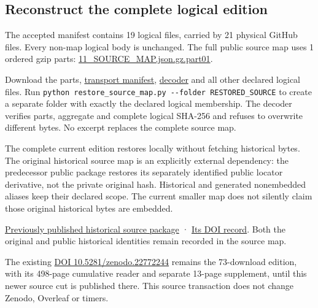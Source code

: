\documentclass[
]{article}
\newcounter{none} %
\begin{document}
\subsection{Reconstruct the complete logical
edition}\label{reconstruct-the-complete-logical-edition}

The accepted manifest contains 19 logical files, carried by 21 physical
GitHub files. Every non-map logical body is unchanged. The full public
source map uses 1 ordered gzip parts:
\href{https://github.com/KokunoYumeto/zeta-function-research-reader/blob/main/workbenches/splitzero-tandem/continuations/20260915-primitive-band-continuation/11_SOURCE_MAP.json.gz.part01}{11\_SOURCE\_MAP.json.gz.part01}.

Download the parts,
\href{https://github.com/KokunoYumeto/zeta-function-research-reader/blob/main/workbenches/splitzero-tandem/continuations/20260915-primitive-band-continuation/SOURCE_MAP_TRANSPORT.json}{transport
manifest},
\href{https://github.com/KokunoYumeto/zeta-function-research-reader/blob/main/workbenches/splitzero-tandem/continuations/20260915-primitive-band-continuation/restore_source_map.py}{decoder}
and all other declared logical files. Run
\texttt{python\ restore\_source\_map.py\ -\/-folder\ RESTORED\_SOURCE}
to create a separate folder with exactly the declared logical
membership. The decoder verifies parts, aggregate and complete logical
SHA-256 and refuses to overwrite different bytes. No excerpt replaces
the complete source map.

The complete current edition restores locally without fetching
historical bytes. The original historical source map is an explicitly
external dependency: the predecessor public package restores its
separately identified public locator derivative, not the private
original hash. Historical and generated nonembedded aliases keep their
declared scope. The current smaller map does not silently claim those
original historical bytes are embedded.

\href{https://zenodo.org/api/records/22772244/files/73-native-conductor-sources.zip/content}{Previously
published historical source package} ·
\href{https://zenodo.org/records/22772244}{Its DOI record}. Both the
original and public historical identities remain recorded in the source
map.

The existing \href{https://doi.org/10.5281/zenodo.22772244}{DOI
10.5281/zenodo.22772244} remains the 73-download edition, with its
498-page cumulative reader and separate 13-page supplement, until this
newer source cut is published there. This source transaction does not
change Zenodo, Overleaf or timers.
\end{document}
